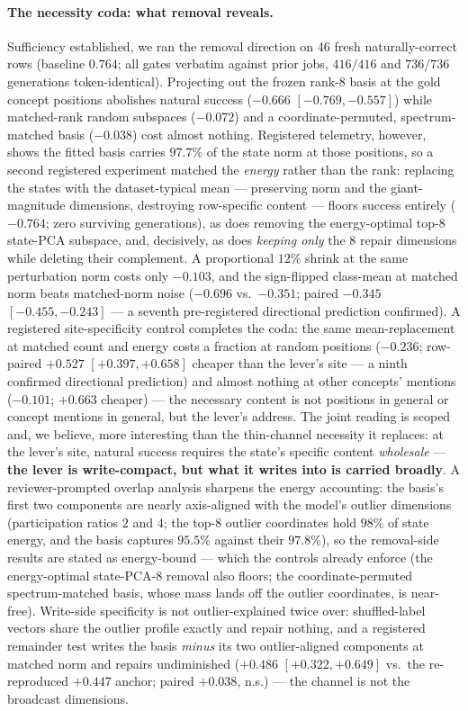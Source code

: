 \documentclass{article} %
\begin{document}
\paragraph{The necessity coda: what removal reveals.} Sufficiency
established, we ran the removal direction on 46 fresh naturally-correct
rows (baseline $0.764$; all gates verbatim against prior jobs,
$416/416$ and $736/736$ generations token-identical). Projecting out
the frozen rank-8 basis at the gold concept positions abolishes natural
success ($-0.666$ $[-0.769, -0.557]$) while matched-rank random
subspaces ($-0.072$) and a coordinate-permuted, spectrum-matched basis
($-0.038$) cost almost nothing. Registered telemetry, however, shows
the fitted basis carries $97.7\%$ of the state norm at those positions,
so a second registered experiment matched the \emph{energy} rather than
the rank: replacing the states with the dataset-typical mean ---
preserving norm and the giant-magnitude dimensions, destroying
row-specific content --- floors success entirely ($-0.764$; zero
surviving generations), as does removing the energy-optimal top-8
state-PCA subspace, and, decisively, as does \emph{keeping only} the 8
repair dimensions while deleting their complement. A proportional
$12\%$ shrink at the same perturbation norm costs only $-0.103$, and
the sign-flipped class-mean at matched norm beats matched-norm noise
($-0.696$ vs.\ $-0.351$; paired $-0.345$ $[-0.455, -0.243]$ --- a
seventh pre-registered directional prediction confirmed). A
registered site-specificity control completes the coda: the same
mean-replacement at matched count and energy costs a fraction at
random positions ($-0.236$; row-paired $+0.527$ $[+0.397, +0.658]$
cheaper than the lever's site --- a ninth confirmed directional
prediction) and almost nothing at other concepts' mentions
($-0.101$; $+0.663$ cheaper) --- the necessary content is not
positions in general or concept mentions in general, but the
lever's address. The joint
reading is scoped and, we believe, more interesting than the
thin-channel necessity it replaces: at the lever's site, natural
success requires the state's specific content \emph{wholesale} ---
\textbf{the lever is write-compact, but what it writes into is carried
broadly}. A reviewer-prompted overlap analysis sharpens the energy
accounting: the basis's first two components are nearly axis-aligned
with the model's outlier dimensions (participation ratios $2$ and
$4$; the top-8 outlier coordinates hold $98\%$ of state energy, and
the basis captures $95.5\%$ against their $97.8\%$), so the
removal-side results are stated as energy-bound --- which the
controls already enforce (the energy-optimal state-PCA-8 removal
also floors; the coordinate-permuted spectrum-matched basis, whose
mass lands off the outlier coordinates, is near-free). Write-side
specificity is not outlier-explained twice over: shuffled-label
vectors share the outlier profile exactly and repair nothing, and a
registered remainder test writes the basis \emph{minus} its two
outlier-aligned components at matched norm and repairs undiminished
($+0.486$ $[+0.322, +0.649]$ vs.\ the re-reproduced $+0.447$ anchor;
paired $+0.038$, n.s.) --- the channel is not the broadcast
dimensions.
\end{document}
